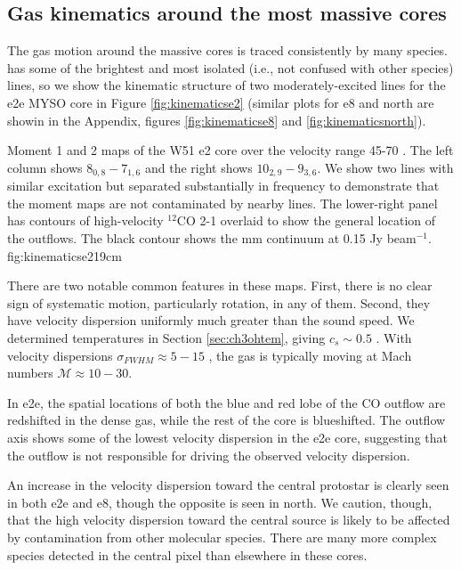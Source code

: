 \documentclass{emulateapj}
\begin{document}
\subsection{Gas kinematics around the most massive cores}
\label{sec:kinematics}
The gas motion around the massive cores is traced consistently by many species.
\methanol has some of the brightest and most isolated (i.e., not confused with
other species) lines, so we show the kinematic structure of two
moderately-excited \methanol lines for the e2e MYSO core in Figure
\ref{fig:kinematicse2} (similar plots for e8 and north are showin in the
Appendix, figures \ref{fig:kinematicse8} and \ref{fig:kinematicsnorth}).

{Moment 1 and 2 maps of the W51 e2 core over the velocity
range 45-70 \kms.  The left column shows \methanol $8_{0,8}-7_{1,6}$
and the right shows \methanol $10_{2,9}-9_{3,6}$.  We show two
lines with similar excitation but separated substantially in frequency
to demonstrate that the moment maps are not contaminated by nearby lines.
The lower-right panel has contours of high-velocity $^{12}$CO 2-1 overlaid
to show the general location of the outflows.  The black contour shows
the mm continuum at 0.15 Jy beam$^{-1}$.}
{fig:kinematicse2}{1}{9cm}


There are two notable common features in these maps. First, there is no clear
sign of systematic motion, particularly rotation, in any of them.  Second, they
have velocity dispersion uniformly much greater than the sound speed.  We
determined temperatures in Section \ref{sec:ch3ohtem}, giving
$c_s\sim0.5$ \kms.  With velocity dispersions $\sigma_{FWHM}\approx5-15$ \kms,
the gas is typically moving at Mach numbers $\mathcal{M}\approx10-30$.


In e2e, the spatial locations of both the blue and red lobe of the CO outflow
are redshifted in the dense gas, while the rest of the core is blueshifted.
The outflow axis shows some of the lowest velocity dispersion in the e2e core,
suggesting that the outflow is not responsible for driving the observed
velocity dispersion.

An increase in the velocity dispersion toward the central protostar is clearly
seen in both e2e and e8, though the opposite is seen in north.  We caution,
though, that the high velocity dispersion toward the central source is likely
to be affected by contamination from other molecular species.  There are many
more complex species detected in the central pixel than elsewhere in these
cores.
\end{document}
